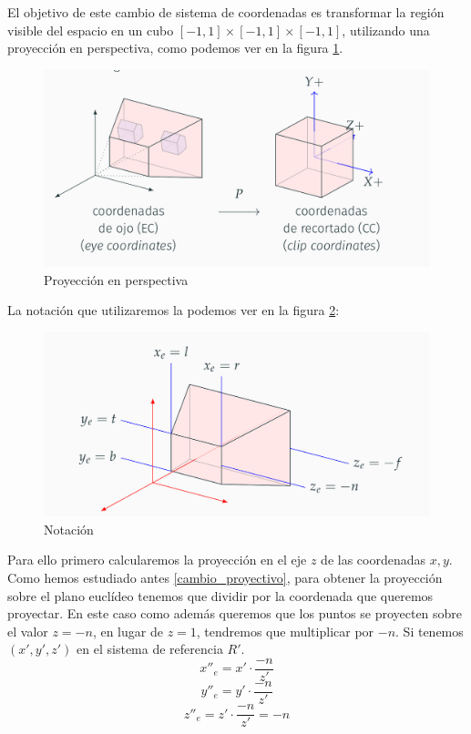\documentclass[a4paper,11pt, oneside]{book}
\begin{document}
El objetivo de este cambio de sistema de coordenadas es transformar la región visible del espacio en un cubo $[-1,1]\times [-1,1]\times [-1,1]$, utilizando una proyección en perspectiva, como podemos ver en la figura \ref{fig:perspectiva}.
\begin{figure}[H]
	
	\centering
	\includegraphics[width=0.9\linewidth]{cubo}
	\caption{Proyección en perspectiva \cite{informatica-grafica}}
	\label{fig:perspectiva}
	
\end{figure}

La notación que utilizaremos la podemos ver en la figura \ref{fig:notacion}:
\begin{figure}[H]
	
	\centering
	\includegraphics[width=0.9\linewidth]{notacion}
	\caption{Notación \cite{informatica-grafica}}
	\label{fig:notacion}
	
\end{figure}

Para ello primero calcularemos la proyección en el eje $z$ de las coordenadas $x,y$. Como hemos estudiado antes \ref{cambio_proyectivo}, para obtener la proyección sobre el plano euclídeo tenemos que dividir por la coordenada que queremos proyectar. En este caso como además queremos que los puntos se proyecten sobre el valor $z=-n$, en lugar de $z=1$, tendremos que multiplicar por $-n$. Si tenemos $(x',y',z')$ en el sistema de referencia $R'$.
\begin{equation}
x''_e = x'\cdot\frac{-n}{z'}
\end{equation}
\begin{equation}
y''_e = y'\cdot\frac{-n}{z'}
\end{equation}
\begin{equation}
z''_e = z'\cdot\frac{-n}{z'} = -n
\end{equation}
\end{document}
